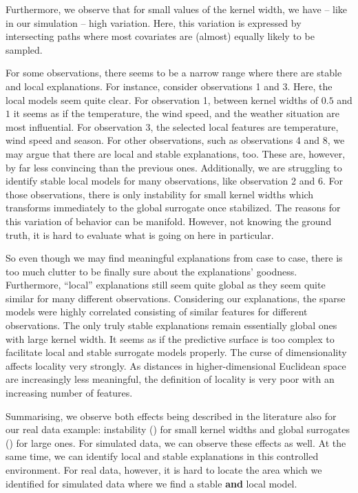 \documentclass[]{krantz}
\begin{document}
Furthermore, we observe that for small values of the kernel width, we
have -- like in our simulation -- high variation. Here, this variation
is expressed by intersecting paths where most covariates are (almost)
equally likely to be sampled.

For some observations, there seems to be a narrow range where there are
stable and local explanations. For instance, consider observations 1 and
3. Here, the local models seem quite clear. For observation 1, between
kernel widths of \(0.5\) and \(1\) it seems as if the temperature, the
wind speed, and the weather situation are most influential. For
observation 3, the selected local features are temperature, wind speed
and season. For other observations, such as observations 4 and 8, we may
argue that there are local and stable explanations, too. These are,
however, by far less convincing than the previous ones. Additionally, we
are struggling to identify stable local models for many observations,
like observation 2 and 6. For those observations, there is only
instability for small kernel widths which transforms immediately to the
global surrogate once stabilized. The reasons for this variation of
behavior can be manifold. However, not knowing the ground truth, it is
hard to evaluate what is going on here in particular.

So even though we may find meaningful explanations from case to case,
there is too much clutter to be finally sure about the explanations'
goodness. Furthermore, ``local'' explanations still seem quite global as
they seem quite similar for many different observations. Considering our
explanations, the sparse models were highly correlated consisting of
similar features for different observations. The only truly stable
explanations remain essentially global ones with large kernel width. It
seems as if the predictive surface is too complex to facilitate local
and stable surrogate models properly. The curse of dimensionality
affects locality very strongly. As distances in higher-dimensional
Euclidean space are increasingly less meaningful, the definition of
locality is very poor with an increasing number of features.

Summarising, we observe both effects being described in the literature
also for our real data example: instability
(\citet{alvarez2018robustness}) for small kernel widths and global
surrogates (\citet{laugel2018defining}) for large ones. For simulated
data, we can observe these effects as well. At the same time, we can
identify local and stable explanations in this controlled environment.
For real data, however, it is hard to locate the area which we
identified for simulated data where we find a stable \textbf{and} local
model.
\end{document}
